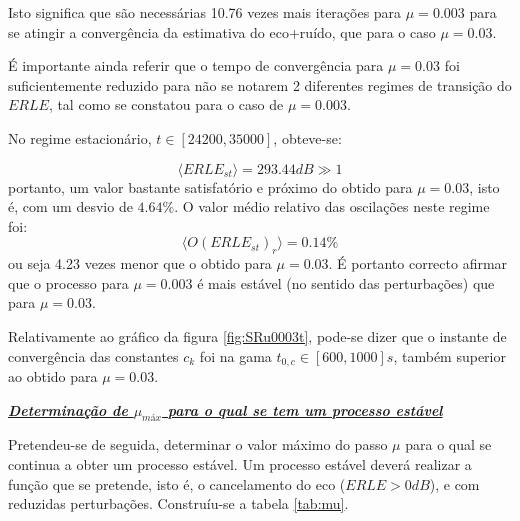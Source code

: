 \documentclass[a4paper,11pt]{report}
\begin{document}
Isto significa que são necessárias 10.76 vezes mais iterações para $\mu=0.003$ para se atingir a convergência da estimativa do eco+ruído, que para o caso $\mu=0.03$.

É importante ainda referir que o tempo de convergência para $\mu=0.03$ foi suficientemente reduzido para não se notarem 2 diferentes regimes de transição do $ERLE$, tal como se constatou para o caso de  $\mu=0.003$.\\
\par No regime estacionário, $t\in[24200,35000]$, obteve-se:

$$\langle ERLE_{st}\rangle=293.44dB\gg1$$ portanto, um valor bastante satisfatório e próximo do obtido para $\mu=0.03$, isto é, com um desvio de $4.64\%$. O valor médio relativo das oscilações neste regime foi: $$\langle O(ERLE_{st})_r \rangle=0.14\%$$ ou seja 4.23 vezes menor que o obtido para $\mu=0.03$. É portanto correcto afirmar que o processo para $\mu=0.003$ é mais estável (no sentido das perturbações) que para $\mu=0.03$. \\
\par
Relativamente ao gráfico da figura \ref{fig:SRu0003t}, pode-se dizer que o instante de convergência das constantes $c_k$ foi na gama $t_{0,c}\in[600,1000]s$, também superior ao obtido para $\mu=0.03$. \\
\par

\large\underline{{\textit{\textbf{Determinação de $\mu_{máx}$ para o qual se tem um processo estável}}}}\\
\par

Pretendeu-se de seguida, determinar o valor máximo do passo $\mu$ para o qual se continua a obter um processo estável. Um processo estável deverá realizar a função que se pretende, isto é, o cancelamento do eco ($ERLE>0dB$), e com reduzidas perturbações. Construíu-se a tabela \ref{tab:mu}.
\end{document}
